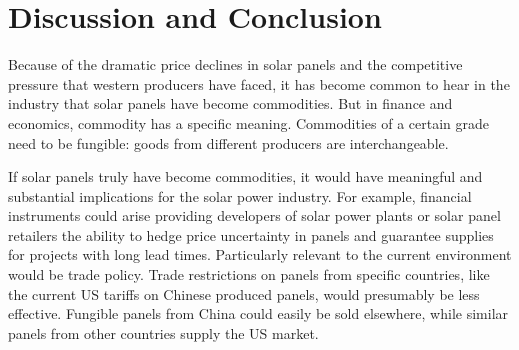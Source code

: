 \documentclass[a4paper]{article}
\begin{document}

\section{Discussion and Conclusion}

Because of the dramatic price declines in solar panels and the competitive pressure that western producers have faced, it has become common to hear in the industry that solar panels have become commodities. But in finance and economics, commodity has a specific meaning. Commodities of a certain grade need to be fungible: goods from different producers are interchangeable.

If solar panels truly have become commodities, it would have meaningful and substantial implications for the solar power industry. For example, financial instruments could arise providing developers of solar power plants or solar panel retailers the ability to hedge price uncertainty in panels and guarantee supplies for projects with long lead times. Particularly relevant to the current environment would be trade policy. Trade restrictions on panels from specific countries, like the current US tariffs on Chinese produced panels, would presumably be less effective. Fungible panels from China could easily be sold elsewhere, while similar panels from other countries supply the US market.
\end{document}
